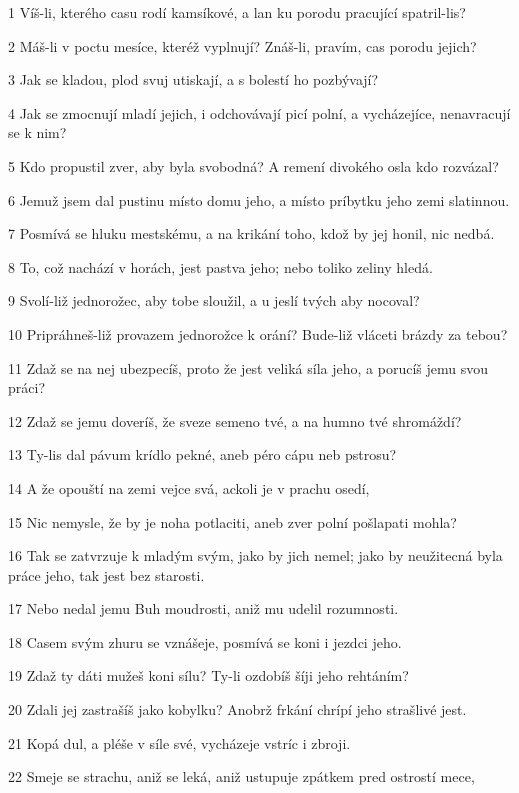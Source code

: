 \par 1 Víš-li, kterého casu rodí kamsíkové, a lan ku porodu pracující spatril-lis?
\par 2 Máš-li v poctu mesíce, kteréž vyplnují? Znáš-li, pravím, cas porodu jejich?
\par 3 Jak se kladou, plod svuj utiskají, a s bolestí ho pozbývají?
\par 4 Jak se zmocnují mladí jejich, i odchovávají picí polní, a vycházejíce, nenavracují se k nim?
\par 5 Kdo propustil zver, aby byla svobodná? A remení divokého osla kdo rozvázal?
\par 6 Jemuž jsem dal pustinu místo domu jeho, a místo príbytku jeho zemi slatinnou.
\par 7 Posmívá se hluku mestskému, a na krikání toho, kdož by jej honil, nic nedbá.
\par 8 To, což nachází v horách, jest pastva jeho; nebo toliko zeliny hledá.
\par 9 Svolí-liž jednorožec, aby tobe sloužil, a u jeslí tvých aby nocoval?
\par 10 Pripráhneš-liž provazem jednorožce k orání? Bude-liž vláceti brázdy za tebou?
\par 11 Zdaž se na nej ubezpecíš, proto že jest veliká síla jeho, a porucíš jemu svou práci?
\par 12 Zdaž se jemu doveríš, že sveze semeno tvé, a na humno tvé shromáždí?
\par 13 Ty-lis dal pávum krídlo pekné, aneb péro cápu neb pstrosu?
\par 14 A že opouští na zemi vejce svá, ackoli je v prachu osedí,
\par 15 Nic nemysle, že by je noha potlaciti, aneb zver polní pošlapati mohla?
\par 16 Tak se zatvrzuje k mladým svým, jako by jich nemel; jako by neužitecná byla práce jeho, tak jest bez starosti.
\par 17 Nebo nedal jemu Buh moudrosti, aniž mu udelil rozumnosti.
\par 18 Casem svým zhuru se vznášeje, posmívá se koni i jezdci jeho.
\par 19 Zdaž ty dáti mužeš koni sílu? Ty-li ozdobíš šíji jeho rehtáním?
\par 20 Zdali jej zastrašíš jako kobylku? Anobrž frkání chrípí jeho strašlivé jest.
\par 21 Kopá dul, a pléše v síle své, vycházeje vstríc i zbroji.
\par 22 Smeje se strachu, aniž se leká, aniž ustupuje zpátkem pred ostrostí mece,
